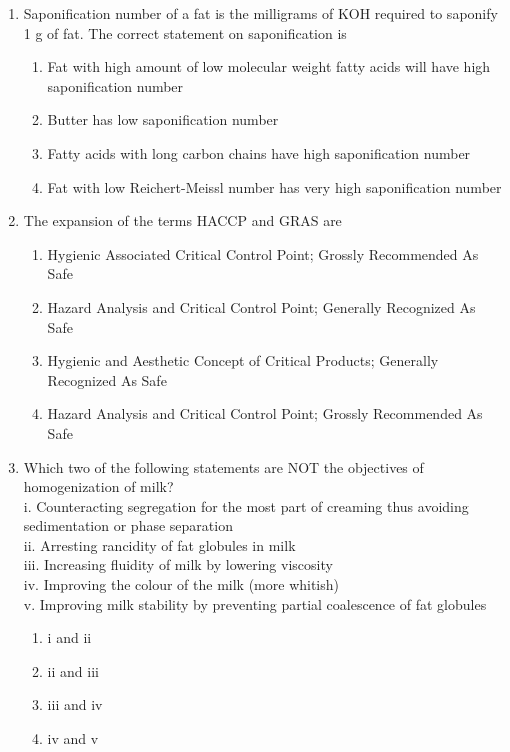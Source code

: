 \documentclass[a4paper,10pt]{article}
\begin{document}
\begin{enumerate}
\item Saponification number of a fat is the milligrams of KOH required to saponify 1 g of fat. The correct statement on saponification is
\hfill{}

\begin{enumerate}
\item Fat with high amount of low molecular weight fatty acids will have high saponification number
\item Butter has low saponification number
\item Fatty acids with long carbon chains have high saponification number
\item Fat with low Reichert-Meissl number has very high saponification number
\end{enumerate}

\item The expansion of the terms HACCP and GRAS are
\hfill{}

\begin{enumerate}
\item Hygienic Associated Critical Control Point; Grossly Recommended As Safe
\item Hazard Analysis and Critical Control Point; Generally Recognized As Safe
\item Hygienic and Aesthetic Concept of Critical Products; Generally Recognized As Safe
\item Hazard Analysis and Critical Control Point; Grossly Recommended As Safe
\end{enumerate}

\item Which two of the following statements are NOT the objectives of homogenization of milk? \\
i. Counteracting segregation for the most part of creaming thus avoiding sedimentation or phase separation \\
ii. Arresting rancidity of fat globules in milk \\
iii. Increasing fluidity of milk by lowering viscosity \\
iv. Improving the colour of the milk (more whitish) \\
v. Improving milk stability by preventing partial coalescence of fat globules
\hfill{}

\begin{multicols}{4}
\begin{enumerate}
\item i and ii
\item ii and iii
\item iii and iv
\item iv and v
\end{enumerate}
\end{multicols}


\end{enumerate}
\end{document}
